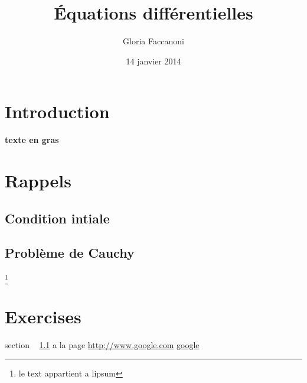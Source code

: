 \documentclass[12pt,a4paper]{scrartcl}
\title{Équations différentielles}
\author{Gloria Faccanoni}
\date{14 janvier 2014}
\begin{document}
\maketitle 

\begin{abstract} 
\lipsum[10]
\end{abstract}
\tableofcontents
\section*{Introduction}
\textbf{texte en gras}
\lipsum[1]
\section{Rappels}
\lipsum[2]
\subsection{Condition intiale}\label{subsec.toto}
\lipsum[3]
\subsection{Problème de Cauchy}
\lipsum[4]
\footnote{le text appartient a lipsum}
\section{Exercises}
\lipsum[5]
section ~ \ref{subsec.toto} a la page \pageref{subsec.toto}
\url{http://www.google.com}
\href{http://www.google.com}{google}
\end{document}
